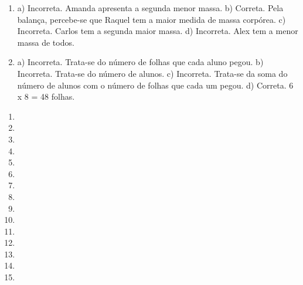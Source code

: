 \begin{enumerate}
\item
a) Incorreta. Amanda apresenta a segunda menor massa.
b) Correta. Pela balança, percebe-se que Raquel tem a maior medida de massa corpórea.
c) Incorreta. Carlos tem a segunda maior massa.
d) Incorreta. Alex tem a menor massa de todos.

\item
a) Incorreta. Trata-se do número de folhas que cada aluno pegou.
b) Incorreta. Trata-se do número de alunos.
c) Incorreta. Trata-se da soma do número de alunos com o número de folhas que cada um pegou.
d) Correta. 6 x 8 = 48 folhas.
\end{enumerate}


\begin{enumerate}
\item

\item

\item

\item

\item

\item

\item

\item

\item

\item

\item

\item

\item

\item

\item
\end{enumerate}